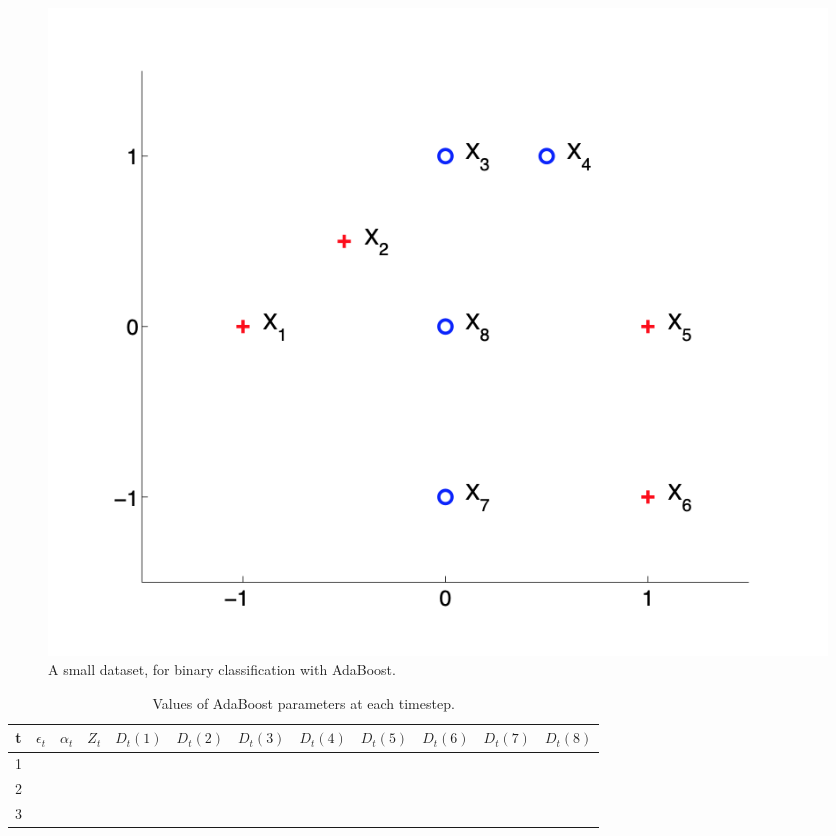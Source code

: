 \documentclass[twoside,12pt]{article}
\begin{document}
\begin{enumerate}
\begin{figure}
\begin{center}
\includegraphics[width = .6\textwidth]{hw}
\end{center}
\caption{ A small dataset, for binary classification with AdaBoost.}
\end{figure}


\begin{table}
\begin{center}
\caption{Values of AdaBoost parameters at each timestep.}
\vspace{0.1in}
\begin{tabular}{|c|c|c|c|c|c|c|c|c|c|c|c|}\hline
t & $\epsilon_t$ & $\alpha_t$ & $Z_t$ & $D_t(1)$ & $D_t(2)$ & $D_t(3)$ & $D_t(4)$ & $D_t(5)$ & $D_t(6)$ & $D_t(7)$ & $D_t(8)$ \\\hline
1 & & & & & & & & & & & \\
2 & & & & & & & & & & &\\
3 & & & & & & & & & & & \\\hline
\end{tabular}
\end{center}
\end{table}


\end{enumerate}
\end{document}
